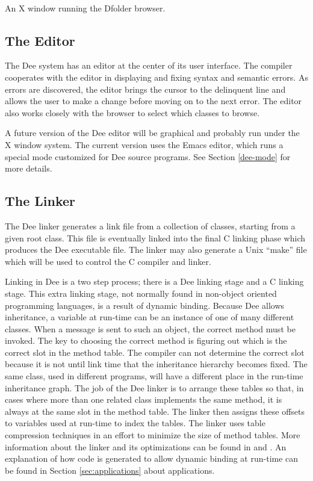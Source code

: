 \begin{shortfigure}
\centerline{\hbox{
}}
\caption{An X window running the Dfolder browser.}
\label{fig:dfolder}
\end{shortfigure}

\subsection{The Editor}

The Dee system has an editor at the center of its user interface.  The
compiler cooperates with the editor in displaying and fixing syntax
and semantic errors.  As errors are discovered, the editor brings the
cursor to the delinquent line and allows the user to make a change
before moving on to the next error.  The editor also works closely
with the browser to select which classes to browse.

A future version of the Dee editor will be graphical and probably run
under the X window system.  The current version uses the Emacs editor,
which runs a special mode customized for Dee source programs.  See
Section \ref{dee-mode} for more details.


\subsection{The Linker}

The Dee linker generates a link file from a collection of classes,
starting from a given root class.  This file is eventually linked into
the final C linking phase which produces the Dee executable file. The
linker may also generate a Unix ``make'' file which will be used to
control the C compiler and linker.

Linking in Dee is a two step process; there is a Dee linking stage and
a C linking stage.  This extra linking stage, not normally found in
non-object oriented programming languages, is a result of dynamic
binding.  Because Dee allows inheritance, a variable at run-time can
be an instance of one of many different classes.  When a message is
sent to such an object, the correct method must be invoked.  The key
to choosing the correct method is figuring out which is the correct
slot in the method table.  The compiler can not determine the correct
slot because it is not until link time that the inheritance hierarchy
becomes fixed.  The same class, used in different programs, will have
a different place in the run-time inheritance graph.  The job of the
Dee linker is to arrange these tables so that, in cases where more
than one related class implements the same method, it is always at the
same slot in the method table.  The linker then assigns these offsets
to variables used at run-time to index the tables.  The linker uses
table compression techniques in an effort to minimize the size of
method tables.  More information about the linker and its
optimizations can be found in
\cite{Bcheung92} and \cite{Grogono90}.  An explanation of how code is
generated to allow dynamic binding at run-time can be found in Section
\ref{sec:applications} about applications.


